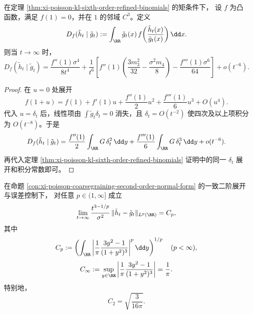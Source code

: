\begin{proposition}\label{prop:xi-poisson-fdiv-sixth-order-refined-binomials}
在定理 \ref{thm:xi-poisson-kl-sixth-order-refined-binomials} 的矩条件下，
设 \(f\) 为凸函数，满足 \(f(1)=0\)，并在 \(1\) 的邻域 \(C^3\)。定义
\[
D_f(\tilde h_t\mid \tilde g_t)
:=\int_{\RR}\tilde g_t(x)\,
f\!\left(\frac{\tilde h_t(x)}{\tilde g_t(x)}\right)\dd x.
\]
则当 \(t\to\infty\) 时，
\begin{equation}\label{eq:xi-poisson-fdiv-sixth-order-refined-binomials}
D_f(\tilde h_t\mid \tilde g_t)
=\frac{f''(1)\sigma^4}{8t^4}
+\frac{1}{t^6}\left[
f''(1)\!\left(\frac{3m_3^2}{32}-\frac{\sigma^2m_4}{8}\right)
-\frac{f'''(1)\sigma^6}{64}
\right]
+o(t^{-6}).
\end{equation}
\end{proposition}

\begin{proof}
在 \(u=0\) 处展开
\[
f(1+u)=f(1)+f'(1)u+\frac{f''(1)}{2}u^2+\frac{f'''(1)}{6}u^3+O(u^4).
\]
代入 \(u=\delta_t\) 后，线性项由 \(\int\tilde g_t\delta_t=0\) 消失，且 \(\delta_t=O(t^{-2})\) 使四次及以上项积分为 \(O(t^{-8})\)。于是
\[
D_f(\tilde h_t\mid \tilde g_t)
=\frac{f''(1)}{2}\int_{\RR}G\,\delta_t^2\,\dd y
+\frac{f'''(1)}{6}\int_{\RR}G\,\delta_t^3\,\dd y
+o(t^{-6}).
\]
再代入定理 \ref{thm:xi-poisson-kl-sixth-order-refined-binomials} 证明中的同一 \(\delta_t\) 展开和积分常数即可。
\end{proof}

\begin{theorem}\label{thm:xi-poisson-lp-universal-scaling-refined}
在命题 \ref{con:xi-poisson-coarsegraining-second-order-normal-form} 的一致二阶展开与误差控制下，
对任意 \(p\in(1,\infty]\) 成立
\begin{equation}\label{eq:xi-poisson-lp-universal-scaling-refined}
\lim_{t\to\infty}\frac{t^{3-1/p}}{\sigma^2}\,\|\tilde h_t-\tilde g_t\|_{L^p(\RR)}=C_p,
\end{equation}
其中
\[
C_p:=\left(\int_{\RR}\left|
\frac{1}{\pi}\frac{3y^2-1}{(1+y^2)^3}
\right|^p\dd y\right)^{1/p}\quad(p<\infty),
\]
\[
C_\infty:=\sup_{y\in\RR}\left|
\frac{1}{\pi}\frac{3y^2-1}{(1+y^2)^3}
\right|=\frac{1}{\pi}.
\]
特别地，
\begin{equation}\label{eq:xi-poisson-lp-c2-refined}
C_2=\sqrt{\frac{3}{16\pi}}.
\end{equation}
\end{theorem}


